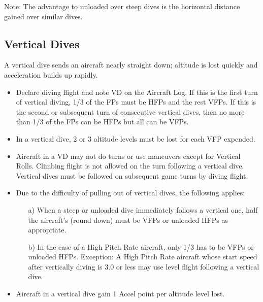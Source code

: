 Note: The advantage to unloaded over steep dives is the horizontal distance gained over similar dives.

\subsection{Vertical Dives}
\label{rule:vertical-dives}

A vertical dive sends an aircraft nearly straight down; altitude is lost quickly and acceleration builds up rapidly.

\begin{itemize}


    \item{} Declare diving flight and note VD on the Aircraft Log. If this is the first turn of vertical diving, 1/3 of the FPs must be HFPs and the rest VFPs. If this is the second or subsequent turn of consecutive vertical dives, then no more than 1/3 of the FPs can be HFPs but all can be VFPs.

    \item{} In a vertical dive, 2 or 3 altitude levels must be lost for each VFP expended.

    \item{} Aircraft in a VD may not do turns or use maneuvers except for Vertical Rolls. Climbing flight is not allowed on the turn following a vertical dive. Vertical dives must be followed on subsequent game turns by diving flight.

    \item{} Due to the difficulty of pulling out of vertical dives, the following applies:
    \begin{enumerate}
        \item[a)] When a steep or unloaded dive immediately follows a vertical one, half the aircraft's  (round down) must be VFPs or unloaded HFPs as appropriate.
        \item[b)]  In the case of a High Pitch Rate aircraft, only 1/3 has to be VFPs or unloaded HFPs. Exception: A High Pitch Rate aircraft whose start speed after vertically diving is 3.0 or less may use level flight following a vertical dive.
    \end{enumerate}

    \item{} Aircraft in a vertical dive gain 1 Accel point per altitude level lost.

\end{itemize}

